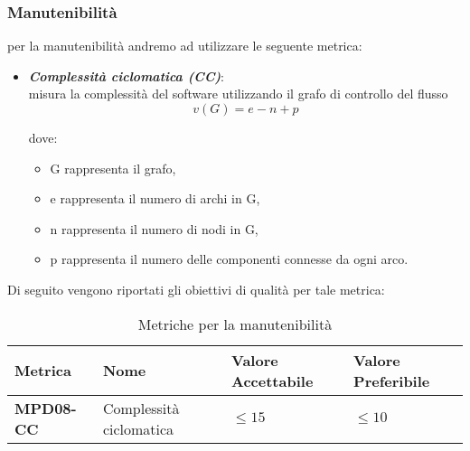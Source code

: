 \subsubsection{Manutenibilità}
per la manutenibilità andremo ad utilizzare le seguente metrica:
\begin{itemize}
    \item \textbf{\emph{Complessità ciclomatica (CC)}}:\\
    misura la complessità del software utilizzando il grafo di controllo del flusso
    \[
    v(G) = e - n + p
    \]

    dove:
    \begin{itemize}
        \item \(\text{G}\) rappresenta il grafo,
        \item \(\text{e}\) rappresenta il numero di archi in G,
        \item \(\text{n}\) rappresenta il numero di nodi in G,
        \item \(\text{p}\) rappresenta il numero delle componenti connesse da ogni arco.
    \end{itemize}
\end{itemize}
Di seguito vengono riportati gli obiettivi di qualità per tale metrica:
\begin{table}[htbp]
    \centering
    \begin{tabular}{|>{\centering\arraybackslash}p{4cm}|p{4cm}|p{4cm}|p{4cm}|}
    \hline
    \rowcolor{gray!30}
    \textbf{Metrica} & \textbf{Nome} & \textbf{Valore Accettabile} & \textbf{Valore Preferibile} \\
    \hline
    \rowcolor{gray!10}
    \textbf{MPD08-CC} & Complessità ciclomatica & $\leq 15 $ & $\leq 10$ \\
    \hline
    \end{tabular}
    \caption{Metriche per la manutenibilità}
    \label{tab:metriche_manutebilita}
\end{table}
\newpage
